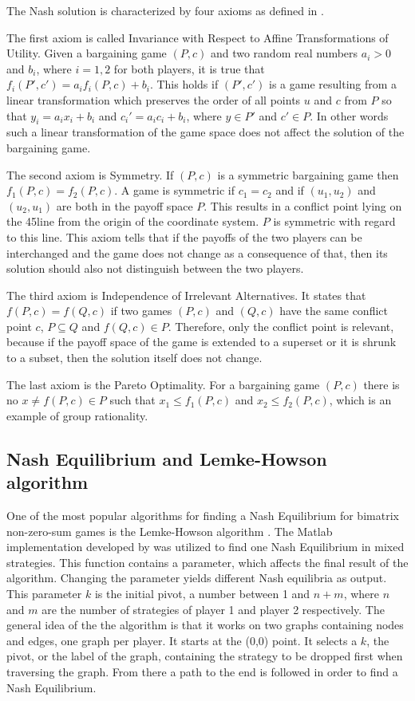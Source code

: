 The Nash solution is characterized by four axioms as defined in \citet{holler2006einfuhrung}. 

The first axiom is called Invariance with Respect to Affine Transformations of Utility. Given a bargaining game $(P,c)$ and two random real numbers $a_i > 0$ and $b_i$, where $i = 1,2$ for both players, it is true that $f_i(P',c') = a_i f_i(P,c) + b_i$. This holds if $(P',c')$ is a game resulting from a linear transformation which preserves the order of all points $u$ and $c$ from $P$ so that $y_i = a_i x_i + b_i$ and $c_i' = a_i c_i + b_i$, where $y \in P'$ and $c' \in P$. In other words such a linear transformation of the game space does not affect the solution of the bargaining game.

The second axiom is Symmetry. If $(P,c)$ is a symmetric bargaining game then $f_1(P,c) = f_2(P,c)$. A game is symmetric if $c_1 = c_2$ and if $(u_1, u_2)$ and $(u_2, u_1)$ are both in the payoff space $P$. This results in a conflict point lying on the 45\textdegree  line from the origin of the coordinate system. $P$ is symmetric with regard to this line. This axiom tells that if the payoffs of the two players can be interchanged and the game does not change as a consequence of that, then its solution should also not distinguish between the two players.

The third axiom is Independence of Irrelevant Alternatives. It states that $f(P,c) = f(Q,c)$ if two games $(P,c)$ and $(Q,c)$ have the same conflict point $c$, $P \subseteq Q$ and $f(Q,c) \in P$. Therefore, only the conflict point is relevant, because if the payoff space of the game is extended to a superset or it is shrunk to a subset, then the solution itself does not change.

The last axiom is the Pareto Optimality. For a bargaining game $(P,c)$ there is no $x \neq f(P,c) \in P$ such that $x_1 \leq f_1(P,c)$ and $x_2 \leq f_2(P,c)$, which is an example of group rationality.

\subsection{Nash Equilibrium and Lemke-Howson algorithm}
One of the most popular algorithms for finding a Nash Equilibrium for bimatrix non-zero-sum games is the Lemke-Howson algorithm \citep{lemke1964equilibrium}. The Matlab implementation developed by \citet{lemkeHowson2014Matlab} was utilized to find one Nash Equilibrium in mixed strategies. This function contains a parameter, which affects the final result of the algorithm. Changing the parameter yields different Nash equilibria as output. This parameter $k$ is the initial pivot, a number between 1 and $n+m$, where $n$ and $m$ are the number of strategies of player 1 and player 2 respectively. The general idea of the the algorithm is that it works on two graphs containing nodes and edges, one graph per player. It starts at the (0,0) point. It selects a $k$, the pivot, or the label of the graph, containing the strategy to be dropped first when traversing the graph. From there a path to the end is followed in order to find a Nash Equilibrium. 

